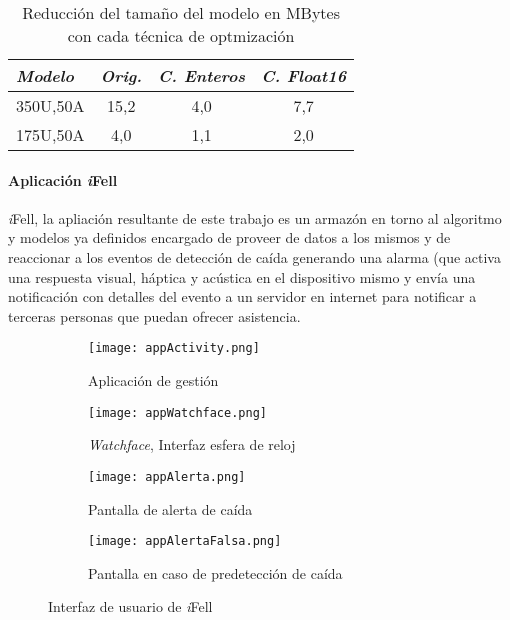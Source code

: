 \documentclass[11pt,a4paper,spanish,twocolumn]{article}
\def\ifell/{\textsl{\textsf{i}}\textsf{Fell}}
\begin{document}
\begin{table}\caption{\label{tab:model:optim} Reducción del tamaño del modelo en MBytes con cada técnica de optmización}
  \begin{tabular}{lccc}\toprule
\emph{Modelo}       & \emph{Orig.}  & \emph{C. Enteros}  & \emph{C. Float16} \\ \midrule
350U,50A            & 15,2          & 4,0                   & 7,7 \\
175U,50A            & 4,0           & 1,1                   & 2,0 \\ \bottomrule
  \end{tabular}
\end{table}

\paragraph{Aplicación \ifell/}

\ifell/, la apliación resultante de este trabajo es un armazón en torno al algoritmo y modelos ya definidos encargado de proveer de datos a los mismos y de reaccionar a los eventos de detección de caída generando una alarma (que activa una respuesta visual, háptica y acústica en el dispositivo mismo y envía una notificación con detalles del evento a un servidor en internet para notificar a terceras personas que puedan ofrecer asistencia.

\begin{figure}[!ht]
  \centering
  \begin{subfigure}[b]{0.4\textwidth}
      \centering
      \texttt{[image: appActivity.png]}
      \caption{\footnotesize Aplicación de gestión}
      \label{fig:uiActivity}
  \end{subfigure}
  \hfill
  \begin{subfigure}[b]{0.4\textwidth}
      \centering
      \texttt{[image: appWatchface.png]}
      \caption{\footnotesize \textit{Watchface}, Interfaz esfera de reloj}
      \label{fig:uiWatchface}
  \end{subfigure}
  \begin{subfigure}[b]{0.4\textwidth}
      \centering
      \texttt{[image: appAlerta.png]}
      \caption{\footnotesize Pantalla de alerta de caída}
      \label{fig:uiAlerta}
  \end{subfigure}
  \hfill
  \begin{subfigure}[b]{0.4\textwidth}
      \centering
      \texttt{[image: appAlertaFalsa.png]}
      \caption{\footnotesize Pantalla en caso de predetección de caída}
      \label{fig:uiAlertaFalsa}
  \end{subfigure}
  \caption{\footnotesize \label{fig:ifell:UI} Interfaz de usuario de \ifell/}
\end{figure}
\end{document}
